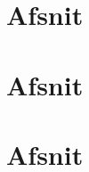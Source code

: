 \documentclass[a4paper,11pt]{article} %
\begin{document}


\tableofcontents
%
\newpage

\section{Afsnit}
%
\newpage

\section{Afsnit}
%
\newpage

\section{Afsnit}
%
\newpage
\end{document}
